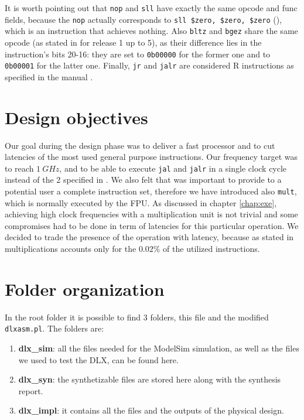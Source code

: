 It is worth pointing out that \verb|nop| and \verb|sll| have exactly the same opcode and func fields,
because the \verb|nop| actually corresponds to \verb|sll $zero, $zero, $zero| (\cite{MIPS64_arch}), which is an instruction that achieves nothing.
Also \verb|bltz| and \verb|bgez| share the same opcode (as stated in \cite{MIPS64_arch} for release 1 up to 5), as their difference lies in the
instruction's bits 20-16: they are set to \verb|0b00000| for the former one and to \verb|0b00001| for the latter one.
Finally, \verb|jr| and \verb|jalr| are considered R instructions as specified in the manual \cite{MIPS64_arch}.

\section{Design objectives}

Our goal during the design phase was to deliver a fast processor and to cut latencies of the most used general purpose instructions. Our frequency target
was to reach $1\ GHz$, and to be able to execute \verb|jal| and \verb|jalr| in a single clock cycle instead of the 2 specified in
\cite{MIPS64_arch}. We also felt that was important to provide to a potential user a complete instruction set, therefore we have introduced also \verb|mult|,
which is normally executed by the FPU. As discussed in chapter \ref{chap:exe}, achieving high clock frequencies with a multiplication unit is not trivial and
some compromises had to be done in term of latencies for this particular operation. We decided to trade the presence of the operation with latency, because as
stated in \cite{code_stats} multiplications accounts only for the $0.02\%$ of the utilized instructions.

\section{Folder organization}

In the root folder it is possible to find 3 folders, this file and the modified \verb|dlxasm.pl|. The folders are:

\begin{enumerate}
    \item \textbf{dlx\_sim}: all the files needed for the ModelSim simulation, as well as the files we used to test the DLX, can be found here.
    \item \textbf{dlx\_syn}: the synthetizable files are stored here along with the synthesis report.
    \item \textbf{dlx\_impl}: it contains all the files and the outputs of the physical design.
\end{enumerate}

